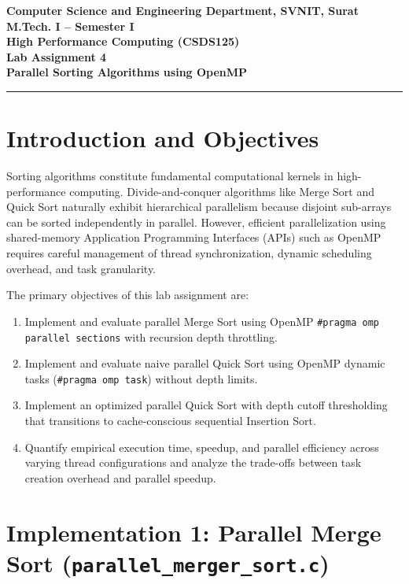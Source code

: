 \documentclass[12pt]{article}
\begin{document}

\begin{center}
\textbf{Computer Science and Engineering Department, SVNIT, Surat}\\
\textbf{M.Tech. I -- Semester I}\\
\textbf{High Performance Computing (CSDS125)}\\
\textbf{Lab Assignment 4}\\
\textbf{Parallel Sorting Algorithms using OpenMP}
\end{center}
\vspace{-4pt}
\hrule
\vspace{6pt}

\section{Introduction and Objectives}
Sorting algorithms constitute fundamental computational kernels in high-performance computing. Divide-and-conquer algorithms like Merge Sort and Quick Sort naturally exhibit hierarchical parallelism because disjoint sub-arrays can be sorted independently in parallel. However, efficient parallelization using shared-memory Application Programming Interfaces (APIs) such as OpenMP requires careful management of thread synchronization, dynamic scheduling overhead, and task granularity.

The primary objectives of this lab assignment are:
\begin{enumerate}
    \item Implement and evaluate parallel Merge Sort using OpenMP \texttt{\#pragma omp parallel sections} with recursion depth throttling.
    \item Implement and evaluate naive parallel Quick Sort using OpenMP dynamic tasks (\texttt{\#pragma omp task}) without depth limits.
    \item Implement an optimized parallel Quick Sort with depth cutoff thresholding that transitions to cache-conscious sequential Insertion Sort.
    \item Quantify empirical execution time, speedup, and parallel efficiency across varying thread configurations and analyze the trade-offs between task creation overhead and parallel speedup.
\end{enumerate}

\section{Implementation 1: Parallel Merge Sort (\texttt{parallel\_merger\_sort.c})}
\end{document}
